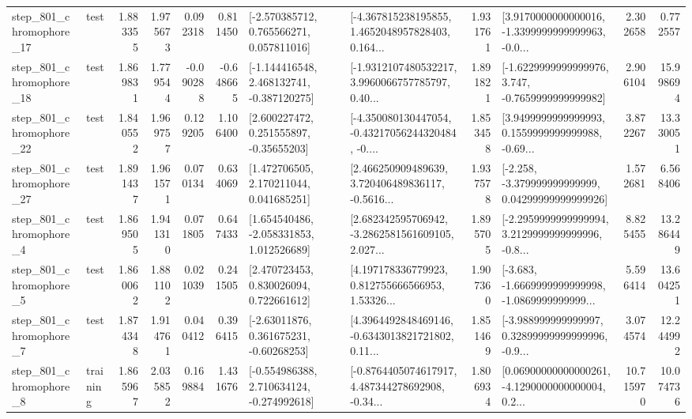 \begin{tabular}{llrrrrllrlrr}
  step\_801\_chromophore\_17 &      test &      1.883355 &    1.975673 &      0.092318 &  0.811450 &    [-2.570385712, 0.765566271, 0.057811016] &  [-4.367815238195855, 1.4652048957828403, 0.164... &       1.931761 &  [3.9170000000000016, -1.3399999999999963, -0.0... &            2.302658 &          0.772557 \\
  step\_801\_chromophore\_18 &      test &      1.869831 &    1.779544 &     -0.090288 & -0.648665 &   [-1.144416548, 2.468132741, -0.387120275] &  [-1.9312107480532217, 3.9960066757785797, 0.40... &       1.891821 &  [-1.6229999999999976, 3.747, -0.7659999999999982] &            2.906104 &         15.998694 \\
  step\_801\_chromophore\_22 &      test &      1.840552 &    1.969757 &      0.129205 &  1.106400 &     [2.600227472, 0.251555897, -0.35655203] &  [-4.350080130447054, -0.43217056244320484, -0.... &       1.853458 &  [3.9499999999999993, 0.1559999999999988, -0.69... &            3.872267 &         13.330051 \\
  step\_801\_chromophore\_27 &      test &      1.891437 &    1.961571 &      0.070134 &  0.634069 &     [1.472706505, 2.170211044, 0.041685251] &  [2.466250909489639, 3.720406489836117, -0.5616... &       1.937578 &  [-2.258, -3.379999999999999, 0.04299999999999926] &            1.572681 &          6.568406 \\
   step\_801\_chromophore\_4 &      test &      1.869505 &    1.941310 &      0.071805 &  0.647433 &    [1.654540486, -2.058331853, 1.012526689] &  [2.682342595706942, -3.2862581561609105, 2.027... &       1.895705 &  [-2.2959999999999994, 3.2129999999999996, -0.8... &            8.825455 &         13.286449 \\
   step\_801\_chromophore\_5 &      test &      1.860062 &    1.881102 &      0.021039 &  0.241505 &     [2.470723453, 0.830026094, 0.722661612] &  [4.197178336779923, 0.812755666566953, 1.53326... &       1.907360 &  [-3.683, -1.6669999999999998, -1.0869999999999... &            5.596414 &         13.604251 \\
   step\_801\_chromophore\_7 &      test &      1.874348 &    1.914761 &      0.040412 &  0.396415 &     [-2.63011876, 0.361675231, -0.60268253] &  [4.3964492848469146, -0.6343013821721802, 0.11... &       1.851469 &  [-3.988999999999997, 0.32899999999999996, -0.9... &            3.074574 &         12.244992 \\
   step\_801\_chromophore\_8 &  training &      1.865967 &    2.035852 &      0.169884 &  1.431676 &   [-0.554986388, 2.710634124, -0.274992618] &  [-0.8764405074617917, 4.487344278692908, -0.34... &       1.806934 &  [0.06900000000000261, -4.1290000000000004, 0.2... &           10.715970 &         10.074736 \\

\end{tabular}
